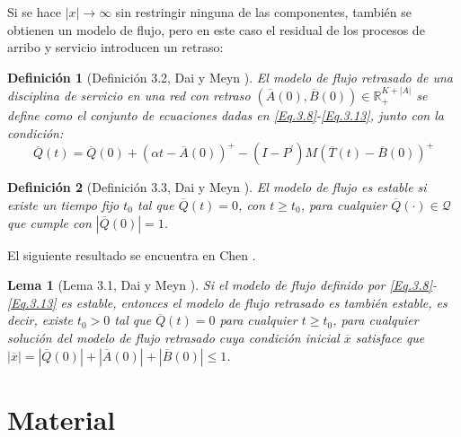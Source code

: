 \documentclass{article}
\newtheorem{Def}{Definición}
\newtheorem{Lemma}{Lema}
\newcommand{\rea}{\mathbb{R}}
\begin{document}
Si se hace $|x|\rightarrow\infty$ sin restringir ninguna de las
componentes, tambi\'en se obtienen un modelo de flujo, pero en
este caso el residual de los procesos de arribo y servicio
introducen un retraso:

\begin{Def}[Definici\'on 3.2, Dai y Meyn \cite{DaiSean}]
El modelo de flujo retrasado de una disciplina de servicio en una
red con retraso
$\left(\overline{A}\left(0\right),\overline{B}\left(0\right)\right)\in\rea_{+}^{K+|A|}$
se define como el conjunto de ecuaciones dadas en
\ref{Eq.3.8}-\ref{Eq.3.13}, junto con la condici\'on:
\begin{equation}\label{CondAd.FluidModel}
\overline{Q}\left(t\right)=\overline{Q}\left(0\right)+\left(\alpha
t-\overline{A}\left(0\right)\right)^{+}-\left(I-P^{'}\right)M\left(\overline{T}\left(t\right)-\overline{B}\left(0\right)\right)^{+}
\end{equation}
\end{Def}

\begin{Def}[Definici\'on 3.3, Dai y Meyn \cite{DaiSean}]
El modelo de flujo es estable si existe un tiempo fijo $t_{0}$ tal
que $\overline{Q}\left(t\right)=0$, con $t\geq t_{0}$, para
cualquier $\overline{Q}\left(\cdot\right)\in\mathcal{Q}$ que
cumple con $|\overline{Q}\left(0\right)|=1$.
\end{Def}

El siguiente resultado se encuentra en Chen \cite{Chen}.
\begin{Lemma}[Lema 3.1, Dai y Meyn \cite{DaiSean}]
Si el modelo de flujo definido por \ref{Eq.3.8}-\ref{Eq.3.13} es
estable, entonces el modelo de flujo retrasado es tambi\'en
estable, es decir, existe $t_{0}>0$ tal que
$\overline{Q}\left(t\right)=0$ para cualquier $t\geq t_{0}$, para
cualquier soluci\'on del modelo de flujo retrasado cuya
condici\'on inicial $\overline{x}$ satisface que
$|\overline{x}|=|\overline{Q}\left(0\right)|+|\overline{A}\left(0\right)|+|\overline{B}\left(0\right)|\leq1$.
\end{Lemma}

\part{Material}
%
\end{document}
